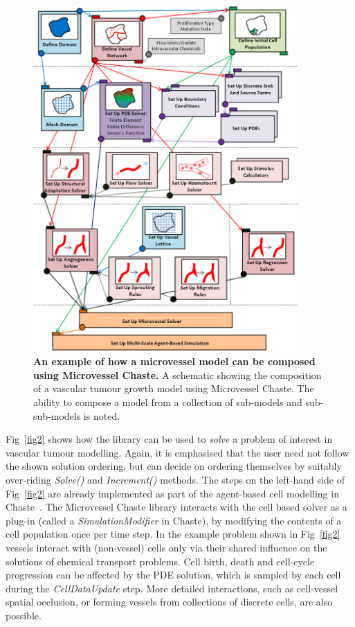 \documentclass[10pt,letterpaper]{article}
\begin{document}
\begin{figure}[!h]
\centering
\includegraphics[width=0.9\textwidth]{Fig1.png}
\caption{{\bf An example of how a microvessel model can be composed using Microvessel Chaste.}
A schematic showing the composition of a vascular tumour growth model using Microvessel Chaste. The ability to compose a model from a collection of sub-models and sub-sub-models is noted.}
\label{fig1}
\end{figure}

Fig~\ref{fig2} shows how the library can be used to \emph{solve} a problem of interest in vascular tumour modelling. Again, it is emphasised that the user need not follow the shown solution ordering, but can decide on ordering themselves by suitably over-riding \textit{Solve()} and \textit{Increment()} methods. The steps on the left-hand side of Fig~\ref{fig2} are already implemented as part of the agent-based cell modelling in Chaste~\cite{Mirams2013}. The Microvessel Chaste library interacts with the cell based solver as a plug-in (called a \textit{SimulationModifier} in Chaste), by modifying the contents of a cell population once per time step. In the example problem shown in Fig~\ref{fig2} vessels interact with (non-vessel) cells only via their shared influence on the solutions of chemical transport problems. Cell birth, death and cell-cycle progression can be affected by the PDE solution, which is sampled by each cell during the \textit{CellDataUpdate} step. More detailed interactions, such as cell-vessel spatial occlusion, or forming vessels from collections of discrete cells, are also possible.
\end{document}

